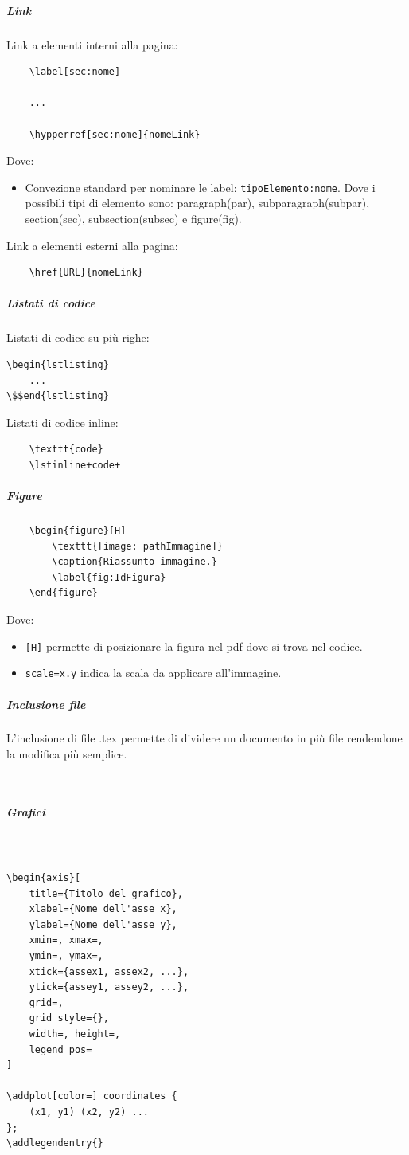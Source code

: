 \subparagraph{Link}
Link a elementi interni alla pagina:
\begin{lstlisting}
    \label[sec:nome]

    ... 

    \hypperref[sec:nome]{nomeLink}
\end{lstlisting}
Dove:
\begin{itemize}
    \item Convezione standard per nominare le label: \texttt{tipoElemento:nome}.
    Dove i possibili tipi di elemento sono: paragraph(par), subparagraph(subpar), section(sec), subsection(subsec) e figure(fig).
\end{itemize}
\noindent Link a elementi esterni alla pagina:
\begin{lstlisting}
    \href{URL}{nomeLink}
\end{lstlisting}

\subparagraph{Listati di codice}
Listati di codice su più righe:
\begin{lstlisting}[mathescape=true]
\begin{lstlisting}
    ...
\$$end{lstlisting}
\end{lstlisting}
\noindent 
Listati di codice inline:
\begin{lstlisting}
    \texttt{code}
    \lstinline+code+
\end{lstlisting}

\subparagraph{Figure}
\begin{lstlisting}
    \begin{figure}[H]
        \texttt{[image: pathImmagine]}
        \caption{Riassunto immagine.}
        \label{fig:IdFigura}
    \end{figure}
\end{lstlisting}
Dove:
\begin{itemize}
    \item \texttt{[H]} permette di posizionare la figura nel pdf dove si trova nel codice.
    \item \texttt{scale=x.y} indica la scala da applicare all'immagine.
\end{itemize}

\subparagraph{Inclusione file}
L'inclusione di file .tex permette di dividere un documento in più file rendendone la modifica più semplice.
\begin{lstlisting}
    
\end{lstlisting} 

\subparagraph{Grafici}
\label{subpar:grafici}
\begin{lstlisting}


\begin{axis}[
    title={Titolo del grafico},
    xlabel={Nome dell'asse x}, 
    ylabel={Nome dell'asse y},
    xmin=, xmax=,  
    ymin=, ymax=,
    xtick={assex1, assex2, ...},
    ytick={assey1, assey2, ...},
    grid=, 
    grid style={},
    width=, height=, 
    legend pos= 
]

\addplot[color=] coordinates {
    (x1, y1) (x2, y2) ...
};
\addlegendentry{}

\end{lstlisting}

